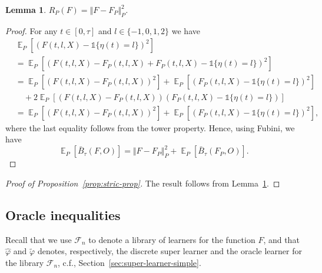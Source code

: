 \documentclass[a4paper,danish]{article}
\theoremstyle{plain} %
\numberwithin{theorem}{section}
\newtheorem{lemma}[theorem]{Lemma}
\theoremstyle{definition} %
\theoremstyle{remark}
\DeclareMathOperator{\E}{\mathbb{E}} %
\renewcommand{\phi}{\varphi}
\newcommand{\1}{\mathds{1}}
\begin{document}
\begin{lemma}
  \label{lemma:norm}
  \( R_{P}(F) = \Vert F - F_P \Vert_{P}^2 \).
\end{lemma}
\begin{proof}[Proof]
  For any \( t \in [0, \tau] \) and \( l\in \{-1,0,1,2\} \) we have
  \begin{align*}
    & \E_{P}{\left[ (F(t, l, X) - \1{\{\eta(t) = l \}})^2 \right]}
    \\
    & =    \E_{P}{\left[ (F(t, l, X) - F_P(t, l, X) + F_P(t, l, X) - \1{\{\eta(t) = l
      \}})^2 \right]}
    \\
    & =    \E_{P}{\left[ (F(t, l, X) - F_P(t, l, X))^2\right]}
      + \E_{P}{\left[ (F_P(t, l, X) - \1{\{\eta(t) = l \}})^2\right]}
    \\
    & \quad
      + 2\E_{P}{\left[ (F(t, l, X) - F_P(t, l, X))(F_P(t, l, X) - \1{\{\eta(t) = l
      \}})\right]}
    \\
    & =    \E_{P}{\left[ (F(t, l, X) - F_P(t, l, X))^2\right]}
      + \E_{P}{\left[ (F_P(t, l, X) - \1{\{\eta(t) = l \}})^2\right]},
  \end{align*}
  where the last equality follows from the tower property. Hence, using Fubini,
  we have
  \begin{equation*}
    \E_P{[\bar{B}_{\tau}(F, O)]}
    = \Vert F - F_P \Vert_{P}^2 + \E_P{[\bar{B}_{\tau}(F_P, O)]}.
  \end{equation*}
\end{proof}

\begin{proof}[Proof of Proposition~\ref{prop:stric-prop}]
  The result follows from Lemma~\ref{lemma:norm}.
\end{proof}

\subsection{Oracle inequalities}
\label{sec:oracle-inequalities}

Recall that we use \( \mathcal{F}_n \) to denote a library of learners for the
function \( F \), and that \( \hat{\phi} \) and \( \tilde{\phi} \) denotes,
respectively, the discrete super learner and the oracle learner for the library
\( \mathcal{F}_n \), c.f., Section~\ref{sec:super-learner-simple}.
\end{document}
